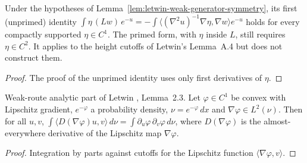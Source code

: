 \begin{lemma}
  \label{lem:letwin-weak-generator-c1}
  \leanok
  Under the hypotheses of Lemma~\ref{lem:letwin-weak-generator-symmetry}, its first (unprimed) identity
  $\int\eta\,(Lw)\,e^{-u}=-\int\langle(\nabla^2u)^{-1}\nabla\eta,\nabla w\rangle e^{-u}$ holds for every compactly supported
  $\eta\in C^1$. The primed form, with $\eta$ inside $L$, still requires $\eta\in C^2$. It applies to the
  height cutoffs of Letwin's Lemma~A.4 but does not construct them.
\end{lemma}
\begin{proof}
  \leanok
  The proof of the unprimed identity uses only first derivatives of $\eta$.
\end{proof}

\begin{lemma}
  \label{lem:letwin-mean-hessian-c11}
  \leanok
  Weak-route analytic part of Letwin \cite{Letwin2026QuadraticKLS}, Lemma~2.3. Let $\varphi\in C^1$ be convex with Lipschitz gradient,
  $e^{-\varphi}$ a probability density, $\nu=e^{-\varphi}\,dx$ and $\nabla\varphi\in L^2(\nu)$. Then for all $u,v$,
  $\int\langle D(\nabla\varphi)u,v\rangle\,d\nu=\int\partial_u\varphi\,\partial_v\varphi\,d\nu$, where $D(\nabla\varphi)$ is the
  almost-everywhere derivative of the Lipschitz map $\nabla\varphi$.
\end{lemma}
\begin{proof}
  \leanok
  Integration by parts against cutoffs for the Lipschitz function $\langle\nabla\varphi,v\rangle$.
\end{proof}

